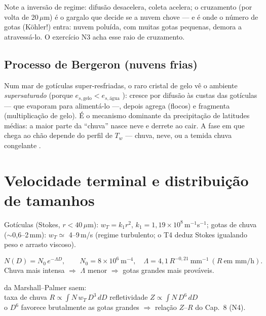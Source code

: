 \documentclass[11pt]{article}
\begin{document}
Note a inversão de regime: difusão desacelera, coleta acelera; o
cruzamento (por volta de 20\,$\mu$m) é o gargalo que decide se a nuvem
chove — e é onde o número de gotas (Köhler!) entra: nuvem poluída, com
muitas gotas pequenas, demora a atravessá-lo. O exercício N3 acha esse
raio de cruzamento.

\subsection{Processo de Bergeron (nuvens frias)}


Num mar de gotículas super-resfriadas, o raro cristal de gelo vê o
ambiente \emph{supersaturado} (porque $e_{s,\text{gelo}} <
e_{s,\text{água}}$ ): cresce por difusão às
custas das gotículas — que evaporam para alimentá-lo —, depois agrega
(flocos) e frag\-menta (multiplicação de gelo). É o mecanismo dominante
da precipitação de latitudes médias: a maior parte da ``chuva'' nasce
neve e derrete ao cair. A fase em que chega ao chão depende do perfil de
$T_w$  — chuva, neve, ou a temida chuva
congelante .

\section{Velocidade terminal e distribuição de tamanhos}
\label{sec:distribuicao}

\begin{formalivro}
Gotículas (Stokes, $r < 40\,\mu$m): $w_T = k_1 r^2$,
$k_1 = 1{,}19\times10^{8}$\,m$^{-1}$s$^{-1}$;
gotas de chuva ($\sim$0{,}6--2\,mm): $w_T \simeq$ 4--9\,m/s (regime
turbulento; o T4 deduz Stokes igualando peso e arrasto viscoso).
\end{formalivro}

\begin{formalivro}
\[ N(D) = N_0\,e^{-\Lambda D},\qquad N_0 = 8\times10^{6}\ \mathrm{m^{-4}},
\quad \Lambda = 4{,}1\,R^{-0{,}21}\ \mathrm{mm^{-1}}\ (R\ \text{em mm/h}). \]
Chuva mais intensa $\Rightarrow$ $\Lambda$ menor $\Rightarrow$ gotas
grandes mais prováveis.
\end{formalivro}

\begin{noquadro}
da Marshall--Palmer saem:\\
taxa de chuva $R \propto \int N\,w_T\,D^3\,dD$ \qquad refletividade
$Z \propto \int N\,D^6\,dD$\\[2pt]
o $D^6$ favorece brutalmente as gotas grandes $\Rightarrow$ relação
$Z$--$R$ do Cap.~8 (N4).
\end{noquadro}
\end{document}
